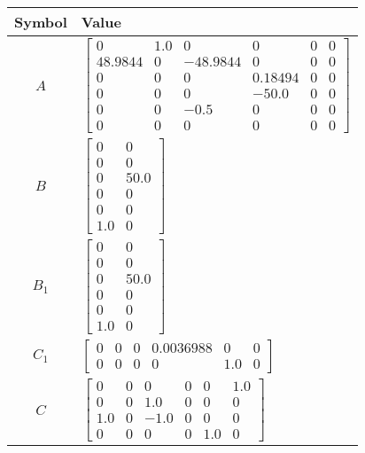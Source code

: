 \begin{tabular}{cl}
\hline
  Symbol  & Value                                                                                                                                                                                                         \\
\hline
   $A$    & $\left[\begin{matrix}0 & 1.0 & 0 & 0 & 0 & 0\\48.9844 & 0 & -48.9844 & 0 & 0 & 0\\0 & 0 & 0 & 0.18494 & 0 & 0\\0 & 0 & 0 & -50.0 & 0 & 0\\0 & 0 & -0.5 & 0 & 0 & 0\\0 & 0 & 0 & 0 & 0 & 0\end{matrix}\right]$ \\
   $B$    & $\left[\begin{matrix}0 & 0\\0 & 0\\0 & 50.0\\0 & 0\\0 & 0\\1.0 & 0\end{matrix}\right]$                                                                                                                        \\
 $B_{1}$  & $\left[\begin{matrix}0 & 0\\0 & 0\\0 & 50.0\\0 & 0\\0 & 0\\1.0 & 0\end{matrix}\right]$                                                                                                                        \\
 $C_{1}$  & $\left[\begin{matrix}0 & 0 & 0 & 0.0036988 & 0 & 0\\0 & 0 & 0 & 0 & 1.0 & 0\end{matrix}\right]$                                                                                                               \\
   $C$    & $\left[\begin{matrix}0 & 0 & 0 & 0 & 0 & 1.0\\0 & 0 & 1.0 & 0 & 0 & 0\\1.0 & 0 & -1.0 & 0 & 0 & 0\\0 & 0 & 0 & 0 & 1.0 & 0\end{matrix}\right]$                                                                \\

\end{tabular}
